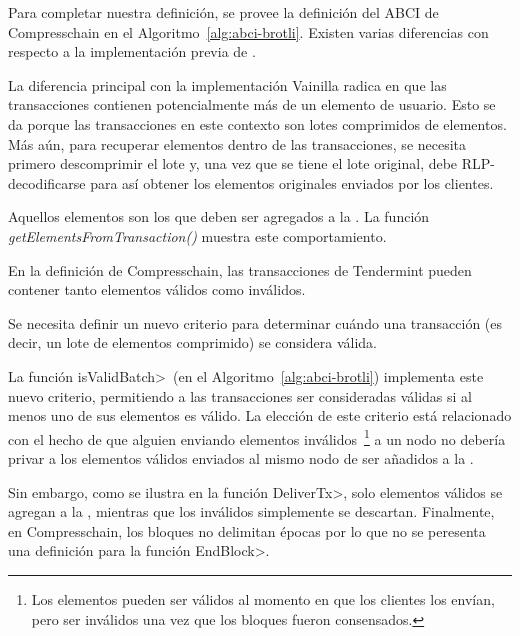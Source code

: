 
%
Para completar nuestra definición, se provee la definición del ABCI de Compresschain en el
Algoritmo~\ref{alg:abci-brotli}.
%
Existen varias diferencias con respecto a la implementación previa de \setchain.
%


La diferencia principal con la implementación Vainilla radica en que las transacciones contienen
potencialmente más de un elemento de usuario. Esto se da porque las transacciones en este contexto
son lotes comprimidos de elementos.
%
Más aún, para recuperar elementos dentro de las transacciones, se necesita primero descomprimir
el lote y, una vez que se tiene el lote original, debe RLP-decodificarse para así obtener los elementos
originales enviados por los clientes.

Aquellos elementos son los que deben ser agregados a la \setchain. La función \textit{getElementsFromTransaction()}
muestra este comportamiento.

En la definición de Compresschain, las transacciones de Tendermint pueden contener tanto elementos válidos
como inválidos.
%

Se necesita definir un nuevo criterio para determinar cuándo una transacción (es decir, un lote de elementos
comprimido) se considera válida.

%
La función \<isValidBatch>~(en el Algoritmo~\ref{alg:abci-brotli}) implementa este nuevo criterio, permitiendo
a las transacciones ser consideradas válidas si al menos uno de sus elementos es válido.
%
La elección de este criterio está relacionado con el hecho de que alguien enviando elementos inválidos~\footnote{
Los elementos pueden ser válidos al momento en que los clientes los envían, pero ser inválidos una vez que
los bloques fueron consensados.} a un nodo no debería privar a los elementos válidos enviados al mismo nodo de
ser añadidos a la \setchain.

%
Sin embargo, como se ilustra en la función \<DeliverTx>, solo elementos válidos se agregan a la \setchain,
mientras que los inválidos simplemente se descartan.
%
Finalmente, en Compresschain, los bloques no delimitan épocas por lo que no se peresenta una definición para
la función \<EndBlock>.

